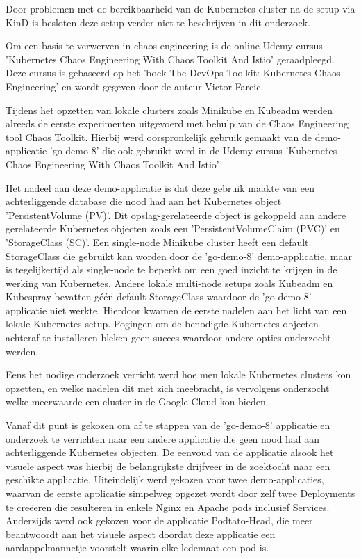 Door problemen met de bereikbaarheid van de Kubernetes cluster na de setup via KinD is besloten deze setup verder niet te beschrijven in dit onderzoek. 

Om een basis te verwerven in chaos engineering is de online Udemy cursus 'Kubernetes Chaos Engineering With Chaos Toolkit And Istio' geraadpleegd. Deze cursus is gebaseerd op het 'boek The DevOps Toolkit: Kubernetes Chaos Engineering' en wordt gegeven door de auteur Victor Farcic.  \autocite{Farcic2020}

Tijdens het opzetten van lokale clusters zoals Minikube en Kubeadm werden alreeds de eerste experimenten uitgevoerd met behulp van de Chaos Engineering tool Chaos Toolkit. Hierbij werd oorspronkelijk gebruik gemaakt van de demo-applicatie 'go-demo-8' die ook gebruikt werd in de Udemy cursus 'Kubernetes Chaos Engineering With Chaos Toolkit And Istio'. 

Het nadeel aan deze demo-applicatie is dat deze gebruik maakte van een achterliggende database die nood had aan het Kubernetes object 'PersistentVolume (PV)'. Dit opslag-gerelateerde object is gekoppeld aan andere gerelateerde Kubernetes objecten zoals een 'PersistentVolumeClaim (PVC)' en 'StorageClass (SC)'. 
\newline Een single-node Minikube cluster heeft een default StorageClass die gebruikt kan worden door de 'go-demo-8' demo-applicatie, maar is tegelijkertijd als single-node te beperkt om een goed inzicht te krijgen in de werking van Kubernetes. 
\newline Andere lokale multi-node setups zoals Kubeadm en Kubespray bevatten géén default StorageClass waardoor de 'go-demo-8' applicatie niet werkte. Hierdoor kwamen de eerste nadelen aan het licht van een lokale Kubernetes setup. Pogingen om de benodigde Kubernetes objecten achteraf te installeren bleken geen succes waardoor andere opties onderzocht werden.  
   
Eens het nodige onderzoek verricht werd hoe men lokale Kubernetes clusters kon opzetten, en welke nadelen dit met zich meebracht, is vervolgens onderzocht welke meerwaarde een cluster in de Google Cloud kon bieden. 

Vanaf dit punt is gekozen om af te stappen van de 'go-demo-8' applicatie en onderzoek te verrichten naar een andere applicatie die geen nood had aan achterliggende Kubernetes objecten. De eenvoud van de applicatie alsook het visuele aspect was hierbij de belangrijkste drijfveer in de zoektocht naar een geschikte applicatie. Uiteindelijk werd gekozen voor twee demo-applicaties, waarvan de eerste applicatie simpelweg opgezet wordt door zelf twee Deployments te creëeren die resulteren in enkele Nginx en Apache pods inclusief Services. Anderzijds werd ook gekozen voor de applicatie Podtato-Head, die meer beantwoordt aan het visuele aspect doordat deze applicatie een aardappelmannetje voorstelt waarin elke ledemaat een pod is.    

